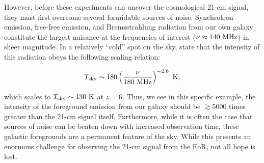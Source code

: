 However, before these experiments can uncover the cosmological 21-cm signal, they must first overcome several formidable sources of noise. Synchrotron emission, free-free emission, and Bremsstrahlung radiation from our own galaxy constitute the largest nuisance at the frequencies of interest ($\nu \approx 140\mhz$) in sheer magnitude. In a relatively ``cold'' spot on the sky, \cite{Furlanetto2006} state that the intensity of this radiation obeys the following scaling relation:

\begin{align}
T_{\text{sky}} \sim 180 \left( \dfrac{\nu}{180\mhz} \right)^{-2.6}\kelvin, \label{eq:Tsky}
\end{align}

which scales to $T_{\text{sky}} \sim 130\kelvin$ at $z = 6$. Thus, we see in this specific example, the intensity of the foreground emission from our galaxy should be $\gtrsim 5000$ times greater than the 21-cm signal itself. Furthermore, while it is often the case that sources of noise can be beaten down with increased observation time, these galactic foregrounds are a permanent feature of the sky.  While this presents an enormous challenge for observing the 21-cm signal from the EoR, not all hope is lost. 


